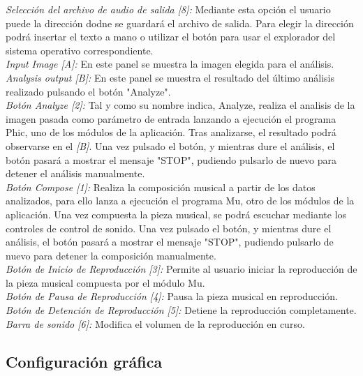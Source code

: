 		\noindent\textit{Selección del archivo de audio de salida [8]:}  Mediante esta opción el usuario puede la dirección dodne se guardará el archivo de salida. Para elegir la dirección podrá insertar el texto a mano o utilizar el botón para usar el explorador del sistema operativo correspondiente.\\
		
		\noindent\textit{Input Image [A]:} En este panel se muestra la imagen elegida para el análisis.\\
		
		\noindent\textit{Analysis output [B]:} En este panel se muestra el resultado del último análisis realizado pulsando el botón "Analyze".\\
		
		\noindent\textit{Botón Analyze [2]:} Tal y como su nombre indica, Analyze, realiza el analisis de la imagen pasada como parámetro de entrada lanzando a ejecución el programa Phic, uno de los módulos de la aplicación. Tras analizarse, el resultado podrá observarse en el \textit{[B]}. Una vez pulsado el botón, y mientras dure el análisis, el botón pasará a mostrar el mensaje "STOP", pudiendo pulsarlo de nuevo para detener el análisis manualmente.\\
		
		\noindent\textit{Botón Compose [1]:} Realiza la composición musical a partir de los datos analizados, para ello lanza a ejecución el programa Mu, otro de los módulos de la aplicación. Una vez compuesta la pieza musical, se podrá escuchar mediante los controles de control de sonido. Una vez pulsado el botón, y mientras dure el análisis, el botón pasará a mostrar el mensaje "STOP", pudiendo pulsarlo de nuevo para detener la composición manualmente.\\
		
		\noindent\textit{Botón de Inicio de Reproducción [3]:} Permite al usuario iniciar la reproducción de la pieza musical compuesta por el módulo Mu.\\
		
		\noindent\textit{Botón de Pausa de Reproducción [4]:} Pausa la pieza musical en reproducción.\\
		
		\noindent\textit{Botón de Detención de Reproducción [5]:} Detiene la reproducción completamente.\\
		
		\noindent\textit{Barra de sonido [6]:} Modifica el volumen de la reproducción en curso.

		
	\subsection{Configuración gráfica}
		
